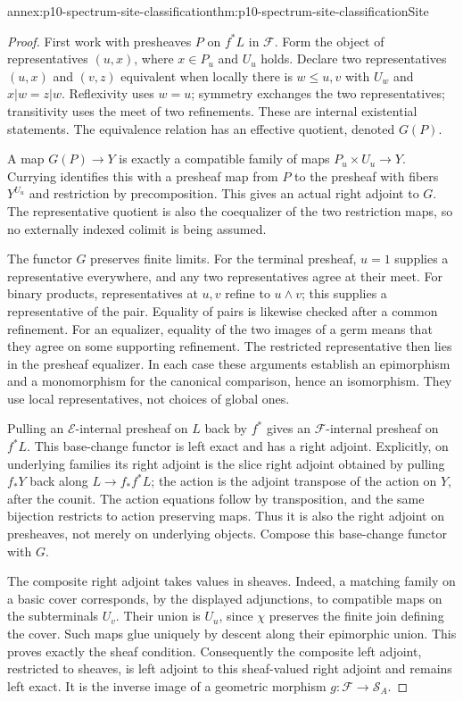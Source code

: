 \begin{annexitem}{annex:p10-spectrum-site-classification}{thm:p10-spectrum-site-classification}{Site}
\begin{proof}
First work with presheaves \(P\) on \(f^*L\) in \(\mathcal F\).
Form the object of representatives \((u,x)\), where
\(x\in P_u\) and \(U_u\) holds. Declare two representatives
\((u,x)\) and \((v,z)\) equivalent when locally there is
\(w\leq u,v\) with \(U_w\) and
\(x|w=z|w\).
Reflexivity uses \(w=u\); symmetry exchanges the two
representatives; transitivity uses the meet of two refinements.
These are internal existential statements. The equivalence
relation has an effective quotient, denoted \(G(P)\).

A map \(G(P)\to Y\) is exactly a compatible family of maps
\(P_u\times U_u\to Y\).
Currying identifies this with a presheaf map from \(P\) to
the presheaf with fibers \(Y^{U_u}\) and restriction by
precomposition. This gives an actual right adjoint to \(G\).
The representative quotient is also the coequalizer of the
two restriction maps, so no externally indexed colimit is
being assumed.

The functor \(G\) preserves finite limits.
For the terminal presheaf, \(u=1\) supplies a representative
everywhere, and any two representatives agree at their meet.
For binary products, representatives at \(u,v\) refine to
\(u\wedge v\); this supplies a representative of the pair.
Equality of pairs is likewise checked after a common refinement.
For an equalizer, equality of the two images of a germ means
that they agree on some supporting refinement. The restricted
representative then lies in the presheaf equalizer.
In each case these arguments establish an epimorphism and a
monomorphism for the canonical comparison, hence an isomorphism.
They use local representatives, not choices of global ones.

Pulling an \(\mathcal E\)-internal presheaf on \(L\) back by
\(f^*\) gives an \(\mathcal F\)-internal presheaf on \(f^*L\).
This base-change functor is left exact and has a right adjoint.
Explicitly, on underlying families its right adjoint is the
slice right adjoint obtained by pulling \(f_*Y\) back along
\(L\to f_*f^*L\); the action is the adjoint transpose of the
action on \(Y\), after the counit. The action equations follow
by transposition, and the same bijection restricts to action
preserving maps. Thus it is also the right adjoint on
presheaves, not merely on underlying objects.
Compose this base-change functor with \(G\).

The composite right adjoint takes values in sheaves.
Indeed, a matching family on a basic cover corresponds, by
the displayed adjunctions, to compatible maps on the
subterminals \(U_v\). Their union is \(U_u\), since \(\chi\)
preserves the finite join defining the cover.
Such maps glue uniquely by descent along their epimorphic
union. This proves exactly the sheaf condition.
Consequently the composite left adjoint, restricted to
sheaves, is left adjoint to this sheaf-valued right adjoint
and remains left exact. It is the inverse image of a
geometric morphism \(g:\mathcal F\to\mathcal S_A\).


\end{proof}
\end{annexitem}
